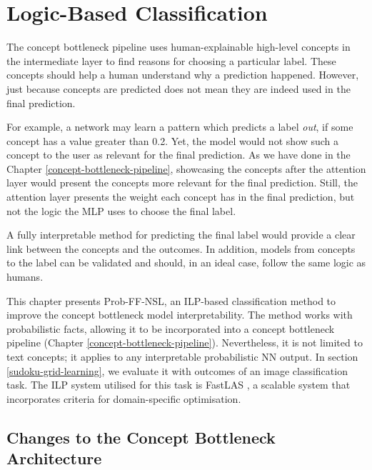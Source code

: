 \chapter{Logic-Based Classification}
\label{logic-based-classification}

The concept bottleneck pipeline \cite{RefWorks:RefID:35-koh2020concept} uses human-explainable high-level concepts in the intermediate layer to find reasons for choosing a particular label.
These concepts should help a human understand why a prediction happened.
However, just because concepts are predicted does not mean they are indeed used in the final prediction.

For example, a network may learn a pattern which predicts a label \emph{out}, if some concept has a value greater than 0.2.
Yet, the model would not show such a concept to the user as relevant for the final prediction.
As we have done in the Chapter \ref{concept-bottleneck-pipeline}, showcasing the concepts after the attention layer would present the concepts more relevant for the final prediction.
Still, the attention layer presents the weight each concept has in the final prediction, but not the logic the MLP uses to choose the final label.

A fully interpretable method for predicting the final label would provide a clear link between the concepts and the outcomes.
In addition, models from concepts to the label can be validated and should, in an ideal case, follow the same logic as humans.

This chapter presents Prob-FF-NSL, an ILP-based classification method to improve the concept bottleneck model interpretability. 
The method works with probabilistic facts, allowing it to be incorporated into a concept bottleneck pipeline (Chapter \ref{concept-bottleneck-pipeline}).
Nevertheless, it is not limited to text concepts; it applies to any interpretable probabilistic NN output. 
In section \ref{sudoku-grid-learning}, we evaluate it with outcomes of an image classification task.
The ILP system utilised for this task is FastLAS \cite{RefWorks:RefID:19-law2020fastlas:}, a scalable system that incorporates criteria for domain-specific optimisation.

\section{Changes to the Concept Bottleneck Architecture}
\label{change-to-the-concept-bottleneck-architecture}

